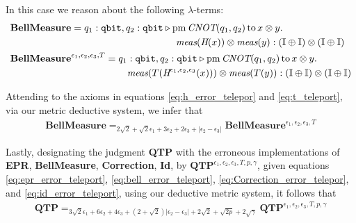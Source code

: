 \begin{example}
    In this case we reason about the following $\lambda$-terms:
    \begin{align*}
      &\textbf{BellMeasure} =  q_{1}: \mathtt{qbit}, q_{2}: \mathtt{qbit}
   \vljud  \text{pm} \, \textit{CNOT} (q_{1},q_{2})
  \,  \text{to}\, x \otimes y. \,
    \\ 
   & \hspace{170pt} \textit{meas} (\textit{H} (x)) \otimes \textit{meas} (y) : \left(\typeI\oplus \typeI\right) \otimes \left(\typeI\oplus
   \typeI\right) \\
      & \textbf{BellMeasure}^{\epsilon_1, \epsilon_2,\epsilon_3,T} =  q_{1}: \mathtt{qbit}, q_{2}: \mathtt{qbit}
      \vljud  \text{pm} \, \textit{CNOT} (q_{1},q_{2})
     \,  \text{to}\, x \otimes y. \,
     \\
      &  \hspace{120pt} \textit{meas} (T(\textit{H}^{\epsilon_1, \epsilon_2,\epsilon_3} (x))) \otimes \textit{meas} ( T(y)):\left(\typeI\oplus \typeI\right) \otimes \left(\typeI\oplus
      \typeI\right) \\
    \end{align*}
  
  Attending to the axioms in equations \eqref{eq:h_error_telepor} and \eqref{eq:t_teleport}, via our metric deductive system, we infer that
  \begin{align} \label{eq:bell_error_teleport}
    \textbf{BellMeasure} =_{2 \sqrt{2} + \sqrt{2}\epsilon_1 + 3\epsilon_2 + 2\epsilon_3 + |\epsilon_2-\epsilon_3|} \textbf{BellMeasure}^{\epsilon_1, \epsilon_2,\epsilon_3,T}
  \end{align}

  Lastly, designating the judgment \textbf{QTP} with the erroneous implementations of \textbf{EPR}, \textbf{BellMeasure}, \textbf{Correction}, \textbf{Id}, by $\textbf{QTP}^{\epsilon_1, \epsilon_2,\epsilon_3,T,p,\gamma}$, given equations \eqref{eq:epr_error_teleport}, \eqref{eq:bell_error_teleport}, \eqref{eq:Correction_error_telepor}, and  \eqref{eq:id_error_teleport}, using our deductive metric system, it follows that
  \begin{align*}
    \textbf{QTP} =_{ 3\sqrt{2}\epsilon_1 + 6\epsilon_2 + 4\epsilon_3 + (2+\sqrt{2})|\epsilon_2-\epsilon_3| + 2 \sqrt{2} + \sqrt{2p}  +2\sqrt{\gamma}} \textbf{QTP}^{\epsilon_1, \epsilon_2,\epsilon_3,T,p,\gamma}
  \end{align*}

\end{example}


